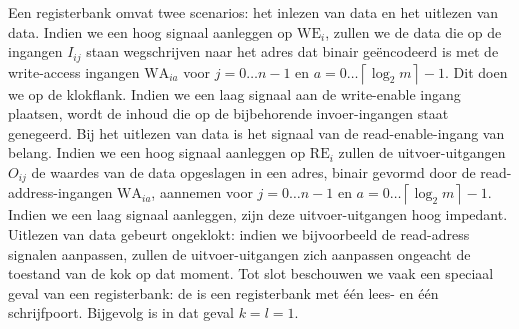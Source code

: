 Een registerbank omvat twee scenarios: het inlezen van data en het uitlezen van data. Indien we een hoog signaal aanleggen op $\mbox{WE}_i$, zullen we de data die op de ingangen $I_{ij}$ staan wegschrijven naar het adres dat binair ge\"encodeerd is met de write-access ingangen $\mbox{WA}_{ia}$ voor $j=0\ldots n-1$ en $a=0\ldots\left\lceil\log_2m\right\rceil-1$. Dit doen we op de klokflank. Indien we een laag signaal aan de write-enable ingang plaatsen, wordt de inhoud die op de bijbehorende invoer-ingangen staat genegeerd. Bij het uitlezen van data is het signaal van de read-enable-ingang van belang. Indien we een hoog signaal aanleggen op $\mbox{RE}_i$ zullen de uitvoer-uitgangen $O_{ij}$ de waardes van de data opgeslagen in een adres, binair gevormd door de read-address-ingangen $\mbox{WA}_{ia}$, aannemen voor $j=0\ldots n-1$ en $a=0\ldots\left\lceil\log_2m\right\rceil-1$. Indien we een laag signaal aanleggen, zijn deze uitvoer-uitgangen hoog impedant. Uitlezen van data gebeurt ongeklokt: indien we bijvoorbeeld de read-adress signalen aanpassen, zullen de uitvoer-uitgangen zich aanpassen ongeacht de toestand van de kok op dat moment. Tot slot beschouwen we vaak een speciaal geval van een registerbank: de  is een registerbank met \'e\'en lees- en \'e\'en schrijfpoort. Bijgevolg is in dat geval $k=l=1$.
